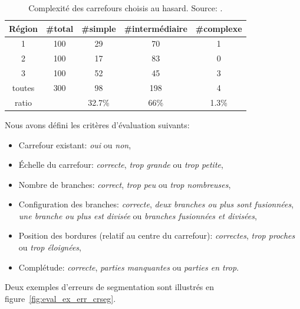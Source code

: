\begin{table}[ht]
    \centering
    \footnotesize
    \begin{tabular}{c|c|c|c|c}
    Région & \#total & \#simple &\#intermédiaire& \#complexe \\
    \hline
     1 & 100 & 29 & 70 & 1 \\
     2 & 100 & 17 & 83 & 0 \\
     3 & 100 & 52 & 45 & 3 \\
     \hline
     toutes & 300 & 98 & 198 & 4 \\
     \hline
     ratio & &  32.7\% & 66\% & 1.3\%\\
    \end{tabular}
    \caption[Complexité des carrefours choisis au hasard]{Complexité des carrefours choisis au hasard. Source: \citep{Favreau2022}.}
    \label{tab:selectedRegions}
\end{table}

\newpar{}

Nous avons défini les critères d'évaluation suivants:
\begin{itemize}
    \item Carrefour existant: \textit{oui} ou \textit{non},
    \item Échelle du carrefour: \textit{correcte}, \textit{trop grande} ou \textit{trop petite},
    \item Nombre de branches: \textit{correct}, \textit{trop peu} ou \textit{trop nombreuses},
    \item Configuration des branches: \textit{correcte}, \textit{deux branches ou plus sont fusionnées}, \textit{une branche ou plus est divisée} ou \textit{branches fusionnées et divisées},
    \item Position des bordures (relatif au centre du carrefour): \textit{correctes}, \textit{trop proches} ou \textit{trop éloignées},
    \item Complétude: \textit{correcte}, \textit{parties manquantes} ou \textit{parties en trop}.
\end{itemize}

\newpar{}

Deux exemples d'erreurs de segmentation sont illustrés en figure~\ref{fig:eval_ex_err_crseg}.

